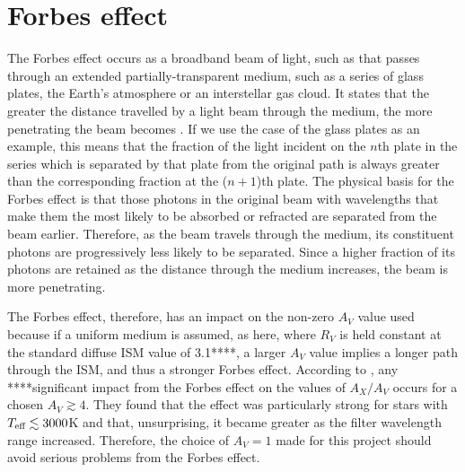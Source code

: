 \documentclass[12pt, a4paper]{report}
\begin{document}
\section{Forbes effect}
The Forbes effect occurs as a broadband beam of light, such as that passes through an extended partially-transparent medium, such as a series of glass plates, the Earth's atmosphere or an interstellar gas cloud. It states that the greater the distance travelled by a light beam through the medium, the more penetrating the beam becomes \citep{1842RSPT..132..225F}. If we use the case of the glass plates as an example, this means that the fraction of the light incident on the $n$th plate in the series which is separated by that plate from the original path is always greater than the corresponding fraction at the ($n+1$)th plate. The physical basis for the Forbes effect is that those photons in the original beam with wavelengths that make them the most likely to be absorbed or refracted are separated from the beam earlier. Therefore, as the beam travels through the medium, its constituent photons are progressively less likely to be separated. Since a higher fraction of its photons are retained as the distance through the medium increases, the beam is more penetrating.

The Forbes effect, therefore, has an impact on the non-zero $A_{V}$ value used because if a uniform medium is assumed, as here, where $R_{V}$ is held constant at the standard diffuse ISM value of 3.1****, a larger $A_{V}$ value implies a longer path through the ISM, and thus a stronger Forbes effect. According to \cite{2008PASP..120..583G}, any ****significant impact from the Forbes effect on the values of $A_{X}/A_{V}$ occurs for a chosen $A_{V} \gtrsim 4$. They found that the effect was particularly strong for stars with $T_{\textnormal{eff}} \lesssim 3000$K and that, unsurprising, it became greater as the filter wavelength range increased. Therefore, the choice of $A_{V} = 1$ made for this project should avoid serious problems from the Forbes effect.



\end{document}
